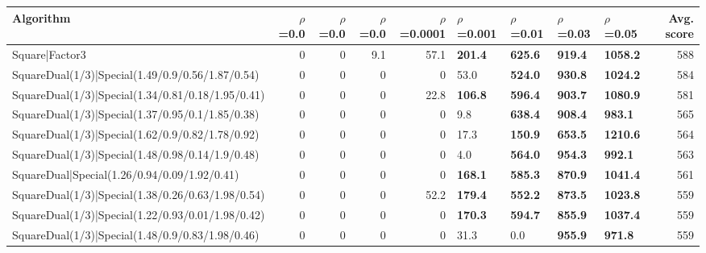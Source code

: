 \begin{tabular}{lrrrrllllr}
\hline
 Algorithm                                               &   $\rho$=0.0 &   $\rho$=0.0 &   $\rho$=0.0 &   $\rho$=0.0001 & $\rho$=0.001   & $\rho$=0.01    & $\rho$=0.03    & $\rho$=0.05     &   Avg. score \\
\hline
 Square|Factor3                                          &          0   &          0   &          9.1 &            57.1 & \textbf{201.4} & \textbf{625.6} & \textbf{919.4} & \textbf{1058.2} &          588 \\
 SquareDual(1/3)|Special(1.49/0.9/0.56/1.87/0.54)        &          0   &          0   &          0   &             0   & 53.0           & \textbf{524.0} & \textbf{930.8} & \textbf{1024.2} &          584 \\
 SquareDual(1/3)|Special(1.34/0.81/0.18/1.95/0.41)       &          0   &          0   &          0   &            22.8 & \textbf{106.8} & \textbf{596.4} & \textbf{903.7} & \textbf{1080.9} &          581 \\
 SquareDual(1/3)|Special(1.37/0.95/0.1/1.85/0.38)        &          0   &          0   &          0   &             0   & 9.8            & \textbf{638.4} & \textbf{908.4} & \textbf{983.1}  &          565 \\
 SquareDual(1/3)|Special(1.62/0.9/0.82/1.78/0.92)        &          0   &          0   &          0   &             0   & 17.3           & \textbf{150.9} & \textbf{653.5} & \textbf{1210.6} &          564 \\
 SquareDual(1/3)|Special(1.48/0.98/0.14/1.9/0.48)        &          0   &          0   &          0   &             0   & 4.0            & \textbf{564.0} & \textbf{954.3} & \textbf{992.1}  &          563 \\
 SquareDual|Special(1.26/0.94/0.09/1.92/0.41)            &          0   &          0   &          0   &             0   & \textbf{168.1} & \textbf{585.3} & \textbf{870.9} & \textbf{1041.4} &          561 \\
 SquareDual(1/3)|Special(1.38/0.26/0.63/1.98/0.54)       &          0   &          0   &          0   &            52.2 & \textbf{179.4} & \textbf{552.2} & \textbf{873.5} & \textbf{1023.8} &          559 \\
 SquareDual(1/3)|Special(1.22/0.93/0.01/1.98/0.42)       &          0   &          0   &          0   &             0   & \textbf{170.3} & \textbf{594.7} & \textbf{855.9} & \textbf{1037.4} &          559 \\
 SquareDual(1/3)|Special(1.48/0.9/0.83/1.98/0.46)        &          0   &          0   &          0   &             0   & 31.3           & 0.0            & \textbf{955.9} & \textbf{971.8}  &          559 \\

\end{tabular}
